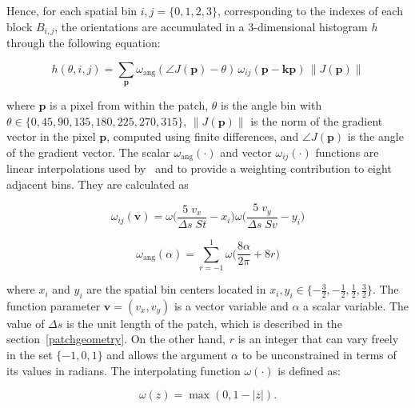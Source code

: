 \documentclass[review]{elsarticle}
\begin{document}
Hence, for each spatial bin $ i,j = \{0,1,2,3\} $, corresponding to the indexes of each block $B_{i,j}$,  the orientations are accumulated in a  $3$-dimensional histogram $h$ through the following equation: 
 

\begin{equation}
 h(\theta,i,j) = \sum_{\mathbf{p}} \omega_\mathrm{ang}(\angle J(\mathbf{p}) - \theta)\, \omega_{ij}\left(\mathbf{p} - \mathbf{kp} \right)\, \left\lVert J(\mathbf{p})\right\rVert 
\label{eq:histogram}
\end{equation}

\noindent  where $\mathbf{p}$ is a pixel from within the patch,  $\theta$ is the angle bin with $ \theta \in \{0, 45, 90, 135, 180, 225, 270, 315\} $,  $ \left\lVert J(\mathbf{p}) \right\rVert $ is the norm of the gradient vector in the pixel $\mathbf{p}$, computed using finite differences, and $\angle J(\mathbf{p}) $ is the angle of the gradient vector.  The scalar $ \omega_\mathrm{ang}(\cdot) $  and vector $ \omega_{ij}(\cdot) $ functions are linear interpolations used by~\cite{Lowe2004} and \cite{Vedaldi2010} to provide a weighting contribution to eight adjacent bins.  They are calculated as  

\begin{equation}
 \omega_{ij}(\mathbf{v}) = \omega \bigg ( \frac{5 \;v_x}{\Delta s \; St} - x_i \bigg ) \omega \bigg ( \frac{5 \; v_y}{\Delta s \; Sv} - y_i \bigg ) 
\label{eq:ij}
\end{equation}

\begin{equation}
 \omega_\mathrm{ang}(\alpha) = \sum_{r=-1}^{1} \omega \bigg ( \frac{8\alpha}{2\pi} + 8r \bigg )
\label{eq:wang}
\end{equation}

\noindent where $x_i$ and $y_i$ are the spatial bin centers located in $ x_i,y_i \in \{-\frac{3}{2},-\frac{1}{2},\frac{1}{2},\frac{3}{2}\} $. The function parameter $\mathbf{v} = ( v_x, v_y ) $ is a vector variable and $\alpha$ a scalar variable.  The value of  $\Delta s$ is the unit length of the patch, which is described in the section~\ref{patchgeometry}.  On the other hand, $r$ is an integer that can vary freely in the set $\{ -1, 0, 1 \} $ and allows the argument $\alpha$ to be unconstrained in terms of its values in radians. The interpolating function $\omega(\cdot)$ is defined as:

\begin{equation}
\omega(z) = \max(0,1-|z|).
\label{eq:weighting}
\end{equation}
\end{document}
